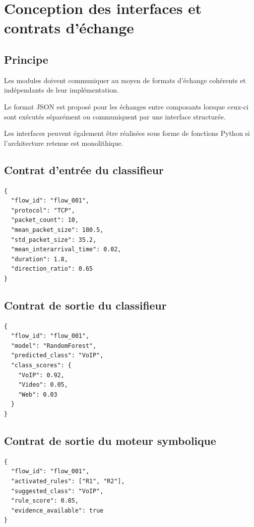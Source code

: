 \section{Conception des interfaces et contrats d'échange}

\subsection{Principe}

Les modules doivent communiquer au moyen de formats
d'échange cohérents et indépendants de leur implémentation.

Le format JSON est proposé pour les échanges entre
composants lorsque ceux-ci sont exécutés séparément
ou communiquent par une interface structurée.

Les interfaces peuvent également être réalisées
sous forme de fonctions Python si l'architecture
retenue est monolithique.

\subsection{Contrat d'entrée du classifieur}

\begin{verbatim}
{
  "flow_id": "flow_001",
  "protocol": "TCP",
  "packet_count": 10,
  "mean_packet_size": 180.5,
  "std_packet_size": 35.2,
  "mean_interarrival_time": 0.02,
  "duration": 1.8,
  "direction_ratio": 0.65
}
\end{verbatim}

\subsection{Contrat de sortie du classifieur}

\begin{verbatim}
{
  "flow_id": "flow_001",
  "model": "RandomForest",
  "predicted_class": "VoIP",
  "class_scores": {
    "VoIP": 0.92,
    "Video": 0.05,
    "Web": 0.03
  }
}
\end{verbatim}

\subsection{Contrat de sortie du moteur symbolique}

\begin{verbatim}
{
  "flow_id": "flow_001",
  "activated_rules": ["R1", "R2"],
  "suggested_class": "VoIP",
  "rule_score": 0.85,
  "evidence_available": true
}
\end{verbatim}

